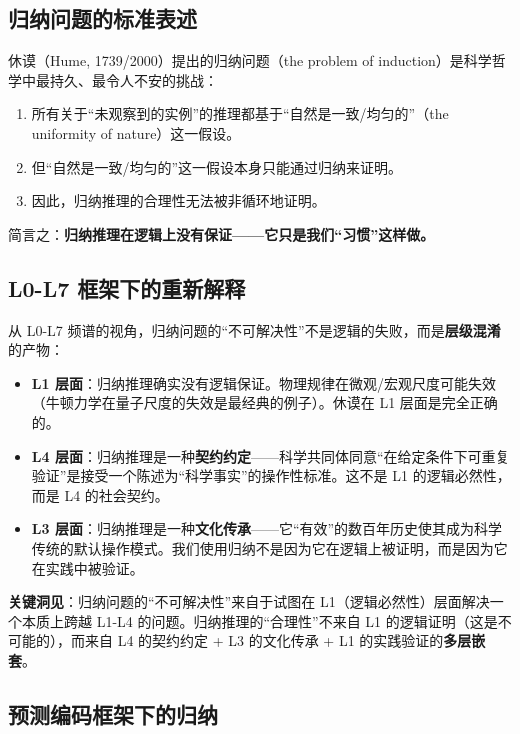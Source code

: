 \documentclass[UTF8,12pt,a4paper]{ctexart}
\begin{document}
\subsection{归纳问题的标准表述}

休谟（Hume, 1739/2000）提出的归纳问题（the problem of induction）是科学哲学中最持久、最令人不安的挑战：

\begin{enumerate}[nosep]
    \item 所有关于``未观察到的实例''的推理都基于``自然是一致/均匀的''（the uniformity of nature）这一假设。
    \item 但``自然是一致/均匀的''这一假设本身只能通过归纳来证明。
    \item 因此，归纳推理的合理性无法被非循环地证明。
\end{enumerate}

简言之：\textbf{归纳推理在逻辑上没有保证——它只是我们``习惯''这样做。}

\subsection{L0-L7 框架下的重新解释}

从 L0-L7 频谱的视角，归纳问题的``不可解决性''不是逻辑的失败，而是\textbf{层级混淆}的产物：

\begin{itemize}[nosep]
    \item \textbf{L1 层面}：归纳推理确实没有逻辑保证。物理规律在微观/宏观尺度可能失效（牛顿力学在量子尺度的失效是最经典的例子）。休谟在 L1 层面是完全正确的。
    \item \textbf{L4 层面}：归纳推理是一种\textbf{契约约定}——科学共同体同意``在给定条件下可重复验证''是接受一个陈述为``科学事实''的操作性标准。这不是 L1 的逻辑必然性，而是 L4 的社会契约。
    \item \textbf{L3 层面}：归纳推理是一种\textbf{文化传承}——它``有效''的数百年历史使其成为科学传统的默认操作模式。我们使用归纳不是因为它在逻辑上被证明，而是因为它在实践中被验证。
\end{itemize}

\textbf{关键洞见}：归纳问题的``不可解决性''来自于试图在 L1（逻辑必然性）层面解决一个本质上跨越 L1-L4 的问题。归纳推理的``合理性''不来自 L1 的逻辑证明（这是不可能的），而来自 L4 的契约约定 + L3 的文化传承 + L1 的实践验证的\textbf{多层嵌套}。

\subsection{预测编码框架下的归纳}
\end{document}

